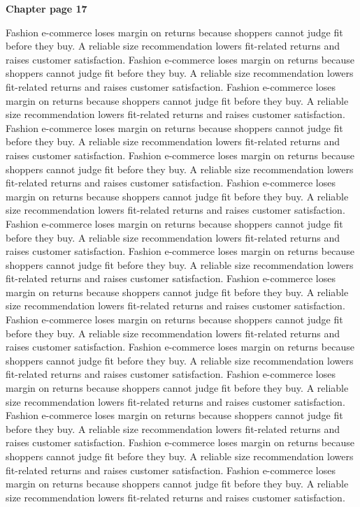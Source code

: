 \documentclass[a4paper,11pt]{article}
\begin{document}
{\headfont\bfseries\Large Chapter page 17}\par\medskip
Fashion e-commerce loses margin on returns because shoppers cannot judge fit before they buy. A reliable size recommendation lowers fit-related returns and raises customer satisfaction. Fashion e-commerce loses margin on returns because shoppers cannot judge fit before they buy. A reliable size recommendation lowers fit-related returns and raises customer satisfaction. Fashion e-commerce loses margin on returns because shoppers cannot judge fit before they buy. A reliable size recommendation lowers fit-related returns and raises customer satisfaction. Fashion e-commerce loses margin on returns because shoppers cannot judge fit before they buy. A reliable size recommendation lowers fit-related returns and raises customer satisfaction. Fashion e-commerce loses margin on returns because shoppers cannot judge fit before they buy. A reliable size recommendation lowers fit-related returns and raises customer satisfaction. 
Fashion e-commerce loses margin on returns because shoppers cannot judge fit before they buy. A reliable size recommendation lowers fit-related returns and raises customer satisfaction. Fashion e-commerce loses margin on returns because shoppers cannot judge fit before they buy. A reliable size recommendation lowers fit-related returns and raises customer satisfaction. Fashion e-commerce loses margin on returns because shoppers cannot judge fit before they buy. A reliable size recommendation lowers fit-related returns and raises customer satisfaction. Fashion e-commerce loses margin on returns because shoppers cannot judge fit before they buy. A reliable size recommendation lowers fit-related returns and raises customer satisfaction. Fashion e-commerce loses margin on returns because shoppers cannot judge fit before they buy. A reliable size recommendation lowers fit-related returns and raises customer satisfaction. 
Fashion e-commerce loses margin on returns because shoppers cannot judge fit before they buy. A reliable size recommendation lowers fit-related returns and raises customer satisfaction. Fashion e-commerce loses margin on returns because shoppers cannot judge fit before they buy. A reliable size recommendation lowers fit-related returns and raises customer satisfaction. Fashion e-commerce loses margin on returns because shoppers cannot judge fit before they buy. A reliable size recommendation lowers fit-related returns and raises customer satisfaction. Fashion e-commerce loses margin on returns because shoppers cannot judge fit before they buy. A reliable size recommendation lowers fit-related returns and raises customer satisfaction. Fashion e-commerce loses margin on returns because shoppers cannot judge fit before they buy. A reliable size recommendation lowers fit-related returns and raises customer satisfaction. \newpage
\end{document}
